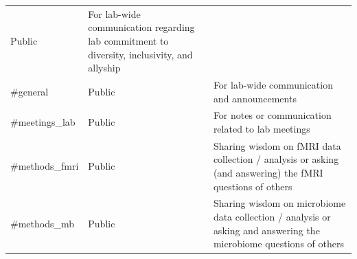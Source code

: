 \documentclass[]{book}
\begin{document}
\begin{longtable}[]{@{}lll@{}}
\begin{minipage}[t]{0.04\columnwidth}
Public\strut
\end{minipage} & \begin{minipage}[t]{0.70\columnwidth}\raggedright
For lab-wide communication regarding lab commitment to diversity, inclusivity, and allyship\strut
\end{minipage}\tabularnewline
\begin{minipage}[t]{0.18\columnwidth}\raggedright
\#general\strut
\end{minipage} & \begin{minipage}[t]{0.04\columnwidth}\raggedright
Public\strut
\end{minipage} & \begin{minipage}[t]{0.70\columnwidth}\raggedright
For lab-wide communication and announcements\strut
\end{minipage}\tabularnewline
\begin{minipage}[t]{0.18\columnwidth}\raggedright
\#meetings\_lab\strut
\end{minipage} & \begin{minipage}[t]{0.04\columnwidth}\raggedright
Public\strut
\end{minipage} & \begin{minipage}[t]{0.70\columnwidth}\raggedright
For notes or communication related to lab meetings\strut
\end{minipage}\tabularnewline
\begin{minipage}[t]{0.18\columnwidth}\raggedright
\#methods\_fmri\strut
\end{minipage} & \begin{minipage}[t]{0.04\columnwidth}\raggedright
Public\strut
\end{minipage} & \begin{minipage}[t]{0.70\columnwidth}\raggedright
Sharing wisdom on fMRI data collection / analysis or asking (and answering) the fMRI questions of others\strut
\end{minipage}\tabularnewline
\begin{minipage}[t]{0.18\columnwidth}\raggedright
\#methods\_mb\strut
\end{minipage} & \begin{minipage}[t]{0.04\columnwidth}\raggedright
Public\strut
\end{minipage} & \begin{minipage}[t]{0.70\columnwidth}\raggedright
Sharing wisdom on microbiome data collection / analysis or asking and answering the microbiome questions of others\strut
\end{minipage}\tabularnewline

\end{longtable}
\end{document}
